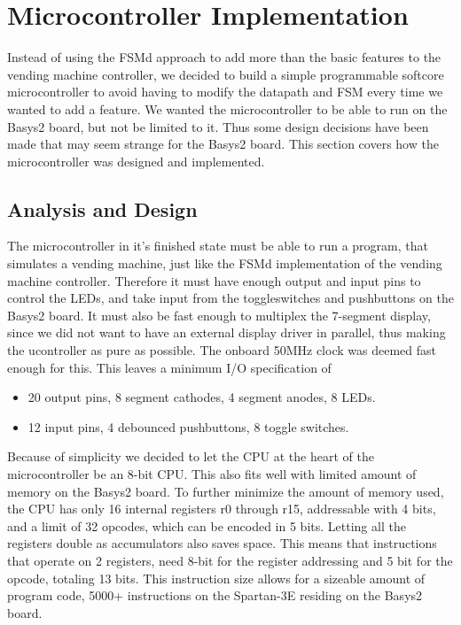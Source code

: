 \section{Microcontroller Implementation}
Instead of using the FSMd approach to add more than the basic features to the vending machine controller,
we decided to build a simple programmable softcore microcontroller to avoid having to modify the datapath
and FSM every time we wanted to add a feature. We wanted the microcontroller to be able to run
on the Basys2 board, but not be limited to it. Thus some design decisions have been made that
may seem strange for the Basys2 board.
This section covers how the microcontroller was designed
and implemented.

\subsection{Analysis and Design}
The microcontroller in it's finished state must be able to run a program, that simulates a vending machine, just like the FSMd
implementation of the vending machine controller. Therefore it must have enough output and input pins to control the
LEDs, and take input from the toggleswitches and pushbuttons on the Basys2 board. It must also be fast enough 
to multiplex the 7-segment display, since we did not want to have an external display driver in parallel, thus making
the ucontroller as pure as possible. The onboard 50MHz clock was deemed fast enough for this. This leaves a 
minimum I/O specification of
\begin{itemize}
    \item 20 output pins, 8 segment cathodes, 4 segment anodes, 8 LEDs.
    \item 12 input pins, 4 debounced pushbuttons, 8 toggle switches.
\end{itemize}
Because of simplicity we decided to let the CPU at the heart of the microcontroller be an 8-bit CPU. This also fits well with limited
amount of memory on the Basys2 board. To further minimize the amount of memory used, the CPU has only 16 internal
registers r0 through r15, addressable with 4 bits, and a limit of 32 opcodes, which can be encoded in 5 bits. Letting all the
registers double as accumulators also saves space. This means that
instructions that operate on 2 registers, need 8-bit for the register addressing and 5 bit for the opcode, totaling 13 bits. 
This instruction size allows for a sizeable amount of program code, 5000+ instructions on the Spartan-3E residing on the
Basys2 board. \\

